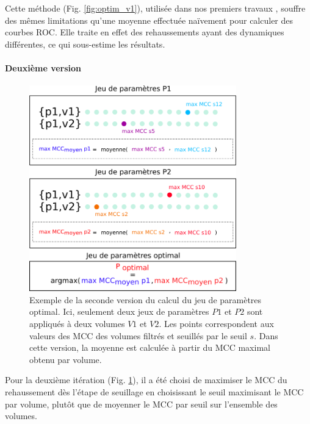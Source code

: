  Cette méthode (Fig. \ref{fig:optim_v1}), utilisée dans nos premiers travaux \cite{Lamy2020_VPH_bench} \cite{Lamy2021_RRPR} \cite{Lamy2020_ICPR} \cite{Lamy2021_ORASIS}, souffre des mêmes limitations qu'une moyenne effectuée naïvement pour calculer des courbes ROC. Elle traite en effet des rehaussements ayant des dynamiques différentes, ce qui sous-estime les résultats. 
  
  \paragraph{Deuxième version}

  \begin{figure}[!ht]
    \centering
    \includegraphics[width=0.80\textwidth]{Images/optim_v2.png}
    \caption{Exemple de la seconde version du calcul du jeu de paramètres optimal. Ici, seulement deux jeux de paramètres $P1$ et $P2$ sont appliqués à deux volumes $V1$ et $V2$. Les points correspondent aux valeurs des MCC des volumes filtrés et seuillés par le seuil $s$. Dans cette version, la moyenne est calculée à partir du MCC maximal obtenu par volume.}
    \label{fig:optim_v2}
  \end{figure}

  Pour la deuxième itération (Fig. \ref{fig:optim_v2}), il a été choisi de maximiser le MCC du rehaussement dès l'étape de seuillage en choisissant le seuil maximisant le MCC par volume, plutôt que de moyenner le MCC par seuil sur l'ensemble des volumes. 

